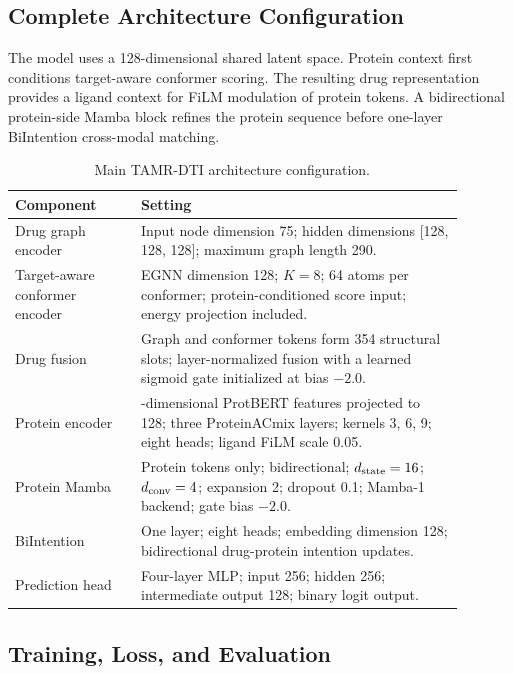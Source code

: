 \subsection{Complete Architecture Configuration}

The model uses a 128-dimensional shared latent space. Protein context first
conditions target-aware conformer scoring. The resulting drug representation
provides a ligand context for FiLM modulation of protein tokens. A
bidirectional protein-side Mamba block refines the protein sequence before
one-layer BiIntention cross-modal matching.

\begin{table}[!htbp]
\centering
\caption{Main TAMR-DTI architecture configuration.}
\label{tab:si_architecture_config}
\scriptsize
\setlength{\tabcolsep}{4pt}
\begin{tabular}{>{\RaggedRight\arraybackslash}p{0.25\linewidth}>{\RaggedRight\arraybackslash}p{0.64\linewidth}}
\toprule
Component & Setting \\
\midrule
Drug graph encoder & Input node dimension 75; hidden dimensions [128, 128, 128]; maximum graph length 290. \\
Target-aware conformer encoder & EGNN dimension 128; $K=8$; 64 atoms per conformer; protein-conditioned score input; energy projection included. \\
Drug fusion & Graph and conformer tokens form 354 structural slots; layer-normalized fusion with a learned sigmoid gate initialized at bias $-2.0$. \\
Protein encoder & 1024-dimensional ProtBERT features projected to 128; three ProteinACmix layers; kernels 3, 6, 9; eight heads; ligand FiLM scale 0.05. \\
Protein Mamba & Protein tokens only; bidirectional; $d_{\rm state}=16$; $d_{\rm conv}=4$; expansion 2; dropout 0.1; Mamba-1 backend; gate bias $-2.0$. \\
BiIntention & One layer; eight heads; embedding dimension 128; bidirectional drug-protein intention updates. \\
Prediction head & Four-layer MLP; input 256; hidden 256; intermediate output 128; binary logit output. \\
\bottomrule
\end{tabular}
\end{table}

\subsection{Training, Loss, and Evaluation}

